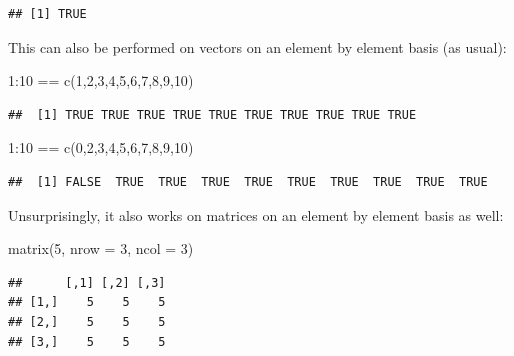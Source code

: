 \documentclass[
]{book}
\newenvironment{Shaded}{\begin{snugshade}}{\end{snugshade}}
\newcommand{\AttributeTok}[1]{\textcolor[rgb]{0.77,0.63,0.00}{#1}}
\newcommand{\DecValTok}[1]{\textcolor[rgb]{0.00,0.00,0.81}{#1}}
\newcommand{\FunctionTok}[1]{\textcolor[rgb]{0.00,0.00,0.00}{#1}}
\newcommand{\NormalTok}[1]{#1}
\newcommand{\SpecialCharTok}[1]{\textcolor[rgb]{0.00,0.00,0.00}{#1}}
\theoremstyle{definition}
\theoremstyle{definition}
\theoremstyle{definition}
\theoremstyle{definition}
\theoremstyle{remark}
\begin{document}
\begin{verbatim}
## [1] TRUE
\end{verbatim}

This can also be performed on vectors on an element by element basis (as usual):

\begin{Shaded}
\begin{Highlighting}[]
\DecValTok{1}\SpecialCharTok{:}\DecValTok{10} \SpecialCharTok{==} \FunctionTok{c}\NormalTok{(}\DecValTok{1}\NormalTok{,}\DecValTok{2}\NormalTok{,}\DecValTok{3}\NormalTok{,}\DecValTok{4}\NormalTok{,}\DecValTok{5}\NormalTok{,}\DecValTok{6}\NormalTok{,}\DecValTok{7}\NormalTok{,}\DecValTok{8}\NormalTok{,}\DecValTok{9}\NormalTok{,}\DecValTok{10}\NormalTok{)}
\end{Highlighting}
\end{Shaded}

\begin{verbatim}
##  [1] TRUE TRUE TRUE TRUE TRUE TRUE TRUE TRUE TRUE TRUE
\end{verbatim}

\begin{Shaded}
\begin{Highlighting}[]
\DecValTok{1}\SpecialCharTok{:}\DecValTok{10} \SpecialCharTok{==} \FunctionTok{c}\NormalTok{(}\DecValTok{0}\NormalTok{,}\DecValTok{2}\NormalTok{,}\DecValTok{3}\NormalTok{,}\DecValTok{4}\NormalTok{,}\DecValTok{5}\NormalTok{,}\DecValTok{6}\NormalTok{,}\DecValTok{7}\NormalTok{,}\DecValTok{8}\NormalTok{,}\DecValTok{9}\NormalTok{,}\DecValTok{10}\NormalTok{)}
\end{Highlighting}
\end{Shaded}

\begin{verbatim}
##  [1] FALSE  TRUE  TRUE  TRUE  TRUE  TRUE  TRUE  TRUE  TRUE  TRUE
\end{verbatim}

Unsurprisingly, it also works on matrices on an element by element basis as well:

\begin{Shaded}
\begin{Highlighting}[]
\FunctionTok{matrix}\NormalTok{(}\DecValTok{5}\NormalTok{, }\AttributeTok{nrow =} \DecValTok{3}\NormalTok{, }\AttributeTok{ncol =} \DecValTok{3}\NormalTok{)}
\end{Highlighting}
\end{Shaded}

\begin{verbatim}
##      [,1] [,2] [,3]
## [1,]    5    5    5
## [2,]    5    5    5
## [3,]    5    5    5
\end{verbatim}
\end{document}
